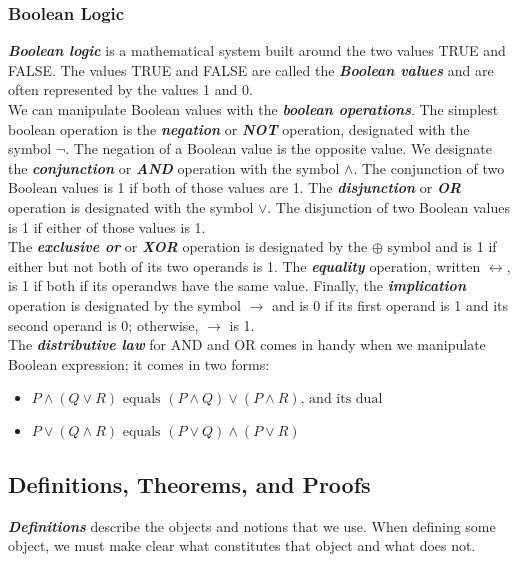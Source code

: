 \documentclass{article}
\newcommand{\define}[1]{\textbf{\textit{#1}}}
\begin{document}
\subsubsection{Boolean Logic}

\define{Boolean logic} is a mathematical system built around the two values TRUE and FALSE. The values TRUE and FALSE are called the \define{Boolean values} and are often represented by the values 1 and 0. \\ 

  We can manipulate Boolean values with the \define{boolean operations}. The simplest boolean operation is the \define{negation} or \define{NOT} operation, designated with the symbol $\neg$. The negation of a Boolean value is the opposite value. We designate the \define{conjunction} or \define{AND} operation with the symbol $\land$. The conjunction of two Boolean values is 1 if both of those values are 1. The \define{disjunction} or \define{OR} operation is designated with the symbol $\lor$. The disjunction of two Boolean values is 1 if either of those values is 1. \\ 

  The \define{exclusive or} or \define{XOR} operation is designated by the $\oplus$ symbol and is 1 if either but not both of its two operands is 1. The \define{equality} operation, written $\leftrightarrow$, is 1 if both if its operandws have the same value. Finally, the \define{implication} operation is designated by the symbol $\rightarrow$ and is 0 if its first operand is 1 and its second operand is 0; otherwise, $\rightarrow$ is 1. \\ 

The \define{distributive law} for AND and OR comes in handy when we manipulate Boolean expression; it comes in two forms: 

\begin{itemize}
  \item $P \land (Q \lor R) \textrm{ equals } (P \land Q) \lor (P \land R) \textrm{, and its dual}$
  \item $P \lor (Q \land R) \textrm{ equals } (P \lor Q) \land (P \lor R)$
\end{itemize}

\subsection{Definitions, Theorems, and Proofs}

\define{Definitions} describe the objects and notions that we use. When defining some object, we must make clear what constitutes that object and what does not. \\
\end{document}
